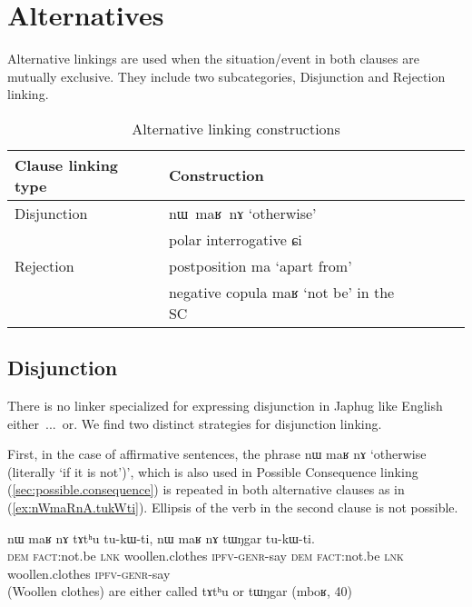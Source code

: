 \documentclass[oldfontcommands,oneside,a4paper,11pt]{article}
\newcommand{\ipa}[1]{{\phon \mbox{#1}}} %
\newcommand{\refb}[1]{(\ref{#1})}
\begin{document}
\section{Alternatives}
Alternative linkings are used when the situation/event in both clauses are mutually exclusive. They include two subcategories,  Disjunction and Rejection linking.  



\begin{table}[h]
\caption{Alternative linking constructions} \label{tab:alternative}
\begin{tabular}{lllll}
\toprule
 Clause linking type &Construction \\
\midrule
Disjunction & \ipa{nɯ maʁ nɤ} `otherwise'\\
& polar interrogative \ipa{ɕi}\\
\midrule
Rejection& postposition \ipa{ma} `apart from' \\
& negative copula \ipa{maʁ} `not be' in the SC\\
\bottomrule
\end{tabular}
\end{table}


\subsection{Disjunction}
There is no linker specialized for expressing disjunction in Japhug like English \ipa{either ... or}. We find two distinct strategies for disjunction linking.

First, in the case of affirmative sentences, the phrase \ipa{nɯ}    	\ipa{maʁ}    	\ipa{nɤ}  `otherwise (literally `if it is not')', which is also used in Possible Consequence linking \refb{sec:possible.consequence} is repeated in both alternative clauses as in \refb{ex:nWmaRnA.tukWti}. Ellipsis of the verb in the second clause  is not possible.
\begin{exe}
\ex \label{ex:nWmaRnA.tukWti}
\gll 
\ipa{nɯ}    	\ipa{maʁ}    	\ipa{nɤ}    	\ipa{tɤtʰu}    	\ipa{tu-kɯ-ti,}    	\ipa{nɯ}    	\ipa{maʁ}    	\ipa{nɤ}    	\ipa{tɯŋgar}    	\ipa{tu-kɯ-ti.}    \\
\textsc{dem} \textsc{fact:}not.be \textsc{lnk} woollen.clothes \textsc{ipfv-genr}-say \textsc{dem} \textsc{fact:}not.be \textsc{lnk} woollen.clothes \textsc{ipfv-genr}-say \\
\glt (Woollen clothes) are either called \ipa{tɤtʰu}  or \ipa{tɯŋgar}    (mboʁ, 40)
 \end{exe}
\end{document}

